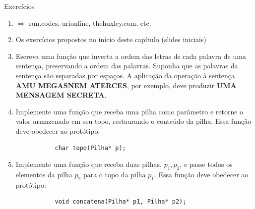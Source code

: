 \begin{frame}[fragile]{Exercícios}
	\begin{enumerate}
	
		\item $\Rightarrow $ run.codes, urionline, thehuxley.com, etc.
	
	\item Os exercícios propostos no início deste capítulo (slides iniciais)
	
	
		\item Escreva uma função que inverta a ordem das letras de cada palavra de uma sentença, preservando a ordem das palavras. Suponha que as palavras da sentença são separadas por espaços. A aplicação da operação à sentença \textbf{AMU MEGASNEM ATERCES}, por exemplo, deve produzir \textbf{UMA MENSAGEM SECRETA}.
		\item Implemente uma função que receba uma pilha como parâmetro e retorne o valor armazenado em seu topo, restaurando o conteúdo da pilha. Essa função deve obedecer ao protótipo: 
		\begin{verbatim}
		   char topo(Pilha* p);
		\end{verbatim} 
		\item Implemente uma função que receba duas pilhas, $p_1, p_2$, e passe todos os elementos da pilha $p_2$ para o topo da pilha $p_1$. Essa função deve obedecer ao protótipo: 
		\begin{verbatim}
		   void concatena(Pilha* p1, Pilha* p2);
		\end{verbatim} 
	\end{enumerate}
\end{frame}
